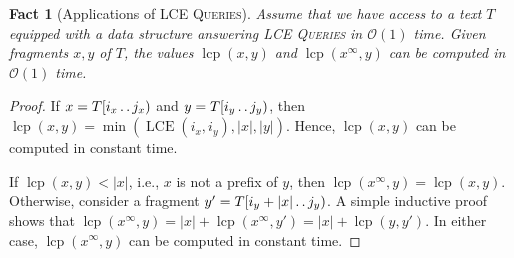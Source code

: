 \documentclass[a4paper]{article}
\newtheorem{fact}[theorem]{Fact}
\theoremstyle{definition}
\theoremstyle{remark}
\newcommand{\LCEQ}{\textsc{LCE Queries}\xspace}
\newcommand{\LCE}{\operatorname{LCE}\xspace}
\newcommand{\lcp}{\operatorname{lcp}}
\newcommand{\lcpinf}[2]{\lcp({#1}^\infty, {#2})}
\newcommand{\dd}{\mathinner{\ldotp\ldotp}}
\newcommand{\Oh}{\mathcal{O}}
\begin{document}
\begin{fact}[Applications of \LCEQ]\label{fct:lce}
Assume that we have access to a text $T$ equipped with a data structure answering \LCEQ in $\Oh(1)$ time.
Given fragments $x,y$ of $T$, the values $\lcp(x,y)$ and $\lcpinf{x}{y}$
can be computed in $\Oh(1)$ time.
\end{fact}
\begin{proof}
If $x=T[i_x\dd j_x)$ and $y=T[i_y\dd j_y)$,
then $\lcp(x,y)=\min(\LCE(i_x,i_y),|x|,|y|)$.
Hence, $\lcp(x,y)$ can be computed in constant time.

If $\lcp(x,y)< |x|$, i.e., $x$ is not a prefix of $y$, then $\lcpinf{x}{y}=\lcp(x,y)$.
Otherwise, consider a fragment $y'=T[i_y+|x|\dd j_y)$. A simple inductive proof shows that 
$\lcpinf{x}{y} = |x|+\lcpinf{x}{y'}=|x|+\lcp(y,y')$.
In either case, $\lcpinf{x}{y}$ can be computed in constant time.
\end{proof}
\end{document}
